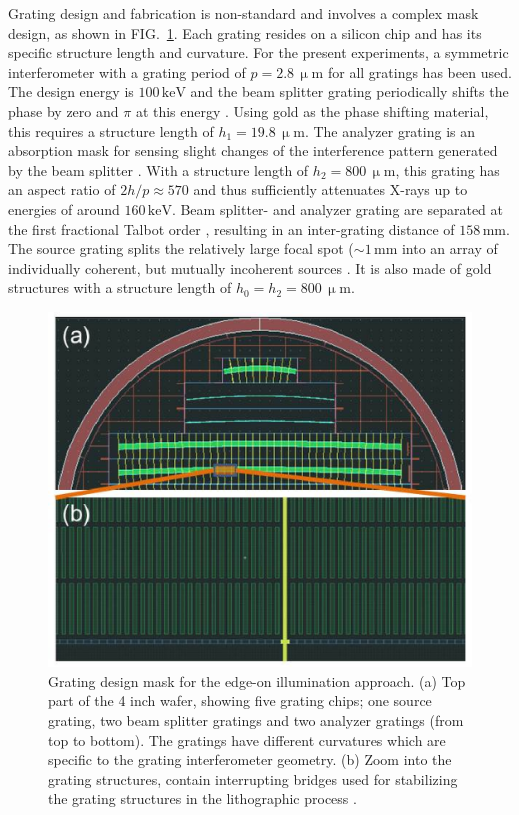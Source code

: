 \documentclass[aip,apl,amsmath,amssymb,floatfix,reprint,a4paper]{revtex4-1}
\newcommand{\unit}[1]{\ensuremath{\, \mathrm{#1}}}
\begin{document}
Grating design and fabrication is non-standard and involves a complex mask design, as shown in FIG.~\ref{Fig:grating_mask}. Each grating resides on a silicon chip and has its specific structure length and curvature. For the present experiments, a symmetric interferometer with a grating period of $p = 2.8 \unit{\upmu m}$ for all gratings has been used. The design energy is $100 \unit{keV}$ and the beam splitter grating periodically shifts the phase by zero and $\pi$ at this energy \cite{David2002}. Using gold as the phase shifting material, this requires a structure length of $h_1 = 19.8 \unit{\upmu m}$. The analyzer grating is an absorption mask for sensing slight changes of the interference pattern generated by the beam splitter \cite{Momose2003a}. With a structure length of $h_2 = 800 \unit{\upmu m}$, this grating has an aspect ratio of $2h/p \approx 570$ and thus sufficiently attenuates X-rays up to energies of around $160 \unit{keV}$. Beam splitter- and analyzer grating are separated at the first fractional Talbot order \cite{Weitkamp2005}, resulting in an inter-grating distance of $158 \unit{mm}$. The source grating splits the relatively large focal spot ($\sim 1 \unit{mm}$ into an array of individually coherent, but mutually incoherent sources \cite{Pfeiffer2006}. It is also made of gold structures with a structure length of $h_0 = h_2 = 800 \unit{\upmu m}$.
\begin{figure} [ht]
  \includegraphics[width = \linewidth]{figures/grating_mask.eps}
  \caption{Grating design mask for the edge-on illumination approach. (a) Top part of the 4 inch wafer, showing five grating chips; one source grating, two beam splitter gratings and two analyzer gratings (from top to bottom). The gratings have different curvatures which are specific to the grating interferometer geometry. (b) Zoom into the grating structures, contain interrupting bridges used for stabilizing the grating structures in the lithographic process \cite{Kenntner2010}.}
  \label{Fig:grating_mask}
\end{figure}
\end{document}
